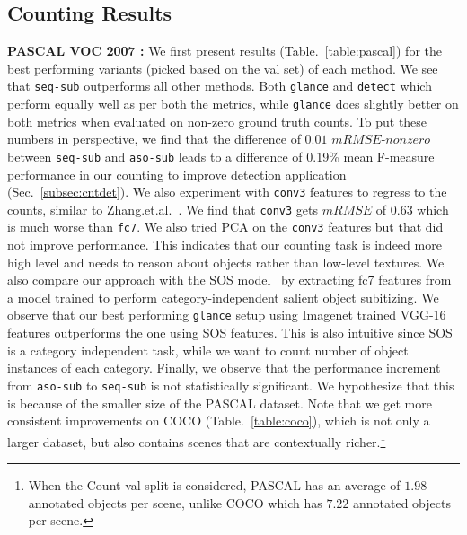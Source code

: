 \documentclass[10pt,twocolumn,letterpaper]{article}
\newcommand{\detect}{\texttt{detect}\xspace}
\newcommand{\sub}{\texttt{aso-sub}\xspace}
\newcommand{\seq}{\texttt{seq-sub}\xspace}
\newcommand{\glance}{\texttt{glance}\xspace}
\newcommand{\refsec}[1]{Sec.~\ref{#1}}
\begin{document}
\subsection{Counting Results}\label{sec:counting_results}
\par \noindent
\textbf{PASCAL VOC 2007 : }We first present results (Table.~\ref{table:pascal}) for the best performing variants (picked based on the val set) of each method. We see that \seq{} outperforms all other methods. 
Both \glance{} and \detect{} which perform equally well as per both the metrics, while \glance does slightly better on both metrics when evaluated on non-zero ground truth counts. 
To put these numbers in perspective, we find that the difference of $0.01$ $mRMSE$-$nonzero$ between \seq and \sub leads to a difference of 0.19\% mean F-measure performance in our counting to improve detection application (\refsec{subsec:cntdet}). 
We also experiment with \texttt{conv3} features to regress to the counts, similar to Zhang.et.al.~\cite{Zhang2015}. We find that \texttt{conv3} gets $mRMSE$ of 0.63 which is much worse than \texttt{fc7}. We also tried PCA on the \texttt{conv3} features but that did not improve performance. This indicates that our counting task is indeed more high level and needs to reason about objects rather than low-level textures. We also compare our approach with the SOS model~\cite{zhang2015salient} by extracting fc7 features from a model trained to perform category-independent salient object subitizing. We observe that our best performing \glance{} setup using Imagenet trained VGG-16 features outperforms the one using SOS features. This is also intuitive since SOS is a category independent task, while we want to count number of object instances of each category. Finally, we observe that the performance increment from \sub{} to \seq{} is not statistically significant. We hypothesize that this is because of the smaller size of the PASCAL dataset. Note that we get more consistent improvements on COCO (Table.~\ref{table:coco}), which is not only a larger dataset, but also contains scenes that are contextually richer.\footnote{When the Count-val split is considered, PASCAL has an average of $1.98$ annotated objects per scene, unlike COCO which has $7.22$ annotated objects per scene.}
\end{document}

